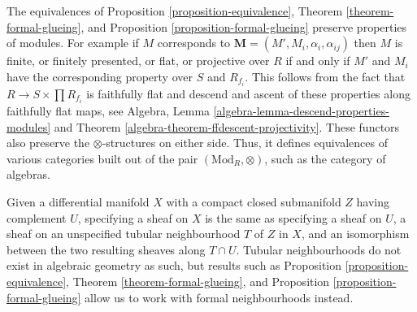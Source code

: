 \begin{remark}
\label{remark-formal-glueing-algebras}
The equivalences of
Proposition \ref{proposition-equivalence},
Theorem \ref{theorem-formal-glueing}, and
Proposition \ref{proposition-formal-glueing}
preserve properties of modules. For example if
$M$ corresponds to $\mathbf{M} = (M', M_i, \alpha_i, \alpha_{ij})$
then $M$ is finite, or finitely presented, or flat, or projective over $R$
if and only if $M'$ and $M_i$ have the corresponding property
over $S$ and $R_{f_i}$. This follows from the fact that
$R \to S \times \prod R_{f_i}$ is faithfully flat and
descend and ascent of these properties along faithfully flat maps, see
Algebra, Lemma \ref{algebra-lemma-descend-properties-modules} and
Theorem \ref{algebra-theorem-ffdescent-projectivity}.
These functors also preserve the $\otimes$-structures on either side.
Thus, it defines equivalences of various categories
built out of the pair $(\text{Mod}_R, \otimes)$, such as the category of
algebras.
\end{remark}

\begin{remark}
\label{remark-topological-analogue}
Given a differential manifold $X$ with a compact closed submanifold $Z$
having complement $U$, specifying a sheaf on $X$ is the same as specifying
a sheaf on $U$, a sheaf on an unspecified tubular neighbourhood $T$ of $Z$ in
$X$, and an isomorphism between the two resulting sheaves along $T \cap U$.
Tubular neighbourhoods do not exist in algebraic geometry as such, but
results such as
Proposition \ref{proposition-equivalence},
Theorem \ref{theorem-formal-glueing}, and
Proposition \ref{proposition-formal-glueing}
allow us to work with formal neighbourhoods instead.
\end{remark}





